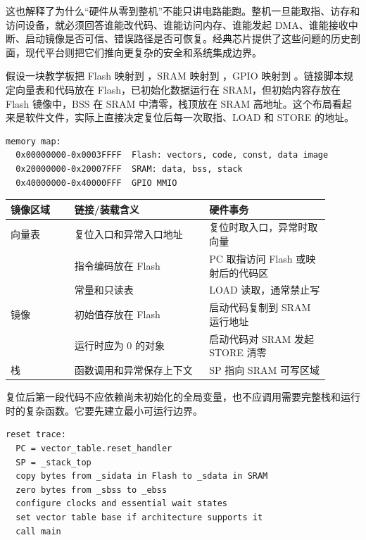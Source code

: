 这也解释了为什么“硬件从零到整机”不能只讲电路能跑。整机一旦能取指、访存和访问设备，就必须回答谁能改代码、谁能访问内存、谁能发起 DMA、谁能接收中断、启动镜像是否可信、错误路径是否可恢复。经典芯片提供了这些问题的历史剖面，现代平台则把它们推向更复杂的安全和系统集成边界。

假设一块教学板把 Flash 映射到 ，SRAM 映射到 ，GPIO 映射到 。链接脚本规定向量表和代码放在 Flash，已初始化数据运行在 SRAM，但初始内容存放在 Flash 镜像中，BSS 在 SRAM 中清零，栈顶放在 SRAM 高地址。这个布局看起来是软件文件，实际上直接决定复位后每一次取指、LOAD 和 STORE 的地址。

\begin{lstlisting}
memory map:
  0x00000000-0x0003FFFF  Flash: vectors, code, const, data image
  0x20000000-0x20007FFF  SRAM: data, bss, stack
  0x40000000-0x40000FFF  GPIO MMIO
\end{lstlisting}

\begin{longtable}{L{0.18\linewidth}L{0.38\linewidth}L{0.34\linewidth}}
\toprule
镜像区域 & 链接/装载含义 & 硬件事务 \\
\midrule
向量表 & 复位入口和异常入口地址 & 复位时取入口，异常时取向量 \\
 & 指令编码放在 Flash & PC 取指访问 Flash 或映射后的代码区 \\
 & 常量和只读表 & LOAD 读取，通常禁止写 \\
 镜像 & 初始值存放在 Flash & 启动代码复制到 SRAM 运行地址 \\
 & 运行时应为 0 的对象 & 启动代码对 SRAM 发起 STORE 清零 \\
栈 & 函数调用和异常保存上下文 & SP 指向 SRAM 可写区域 \\
\bottomrule
\end{longtable}

复位后第一段代码不应依赖尚未初始化的全局变量，也不应调用需要完整栈和运行时的复杂函数。它要先建立最小可运行边界。

\begin{lstlisting}
reset trace:
  PC = vector_table.reset_handler
  SP = _stack_top
  copy bytes from _sidata in Flash to _sdata in SRAM
  zero bytes from _sbss to _ebss
  configure clocks and essential wait states
  set vector table base if architecture supports it
  call main
\end{lstlisting}

